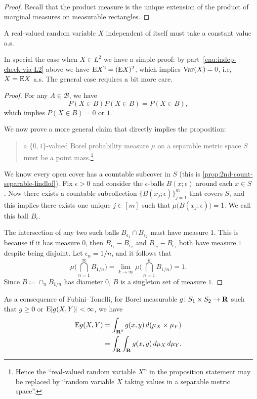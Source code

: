 \begin{proof}
    Recall that the product measure is the unique extension of the product of marginal measures on measurable rectangles.
\end{proof}

\begin{prop}
    A real-valued random variable $X$ independent of itself must take a constant value a.s.
\end{prop}

In special the case when $X \in L^2$ we have a simple proof: by part~\ref{enu:indep-check-via-L2} above we have $\mathop{}\!\mathrm{E} X^2 = (\mathop{}\!\mathrm{E} X)^2$, which implies $\operatorname{Var}(X) = 0$, i.e, $X = \mathop{}\!\mathrm{E} X$ a.s. The general case requires a bit more care.

\begin{proof}
    For any $A\in \mathcal B$, we have \[
    	P(X\in B)P(X\in B) = P(X \in B),
    \] which implies $P(X \in B) = 0$ or $1$.
	
    We now prove a more general claim that directly implies the proposition: 
    \begin{quote}
        a $\{0,1\}$-valued Borel probability measure $\mu$ on a separable metric space $S$ must be a point mass.\footnote{Hence the ``real-valued random variable $X$'' in the proposition statement may be replaced by ``random variable $X$ taking values in a separable metric space''.}
    \end{quote}
    We know every open cover has a countable subcover in $S$ (this is \cref{prop:2nd-count-separable-lindlof}). Fix $\epsilon >0$ and consider the $\epsilon$-balls $B(x;\epsilon)$ around each $x\in S$. Now there exists a countable subcollection $\{B(x_j;\epsilon)\}_{j=1}^m$ that covers $S$, and this implies there exists one unique $j\in [m]$ such that $\mu\bigl(B(x_j;\epsilon)\bigr) = 1$. We call this ball $B_\epsilon$.

    The intersection of any two such balls $B_{\epsilon_1}\cap B_{\epsilon_2}$ must have measure $1$. This is because if it has measure $0$, then $B_{\epsilon_1} - B_{\epsilon_2}$ and $B_{\epsilon_2} - B_{\epsilon_1}$ both have measure $1$ despite being disjoint. Let $\epsilon_n = 1/n$, and it follows that \[
        \mu\biggl(\bigcap_{n=1}^\infty B_{1/n}\biggr) = \lim_{k\to \infty} \mu\biggl(\bigcap_{n=1}^k B_{1/n}\biggr) = 1.
    \] Since $B\coloneqq \cap_{n} B_{1/n}$ has diameter $0$, $B$ is a singleton set of measure $1$.
\end{proof}

As a consequence of Fubini--Tonelli, for Borel measurable $g\colon S_1\times S_2 \to \mathbf{R}$ such that $g \geq 0$ or $\mathop{}\!\mathrm{E} \lvert g(X,Y) \rvert < \infty$, we have \begin{align*}
        \mathop{}\!\mathrm{E} g(X,Y) & = \int_{\mathbf{R}^2} g(x,y)\,d(\mu_X \times \mu_Y) \\ & = \int_{\mathbf{R}}\int_{\mathbf{R}} g(x,y)\,d\mu_X \,d \mu_Y.
    \end{align*}



